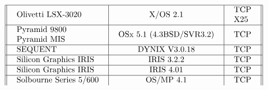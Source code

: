 \[\begin{tabular}[h]{||l|c|c||}
\hline
\begin{tabular}{l} Olivetti LSX-3020 \end{tabular} & \begin{tabular}{l}  X/OS 2.1 \end{tabular} & \begin{tabular}{l} TCP\\X25 \end{tabular} \\
\hline
\begin{tabular}{l} Pyramid 9800\\ Pyramid MIS \end{tabular} & \begin{tabular}{l}  OSx 5.1 (4.3BSD/SVR3.2) \end{tabular} & \begin{tabular}{l} TCP \end{tabular} \\
\hline
\begin{tabular}{l} SEQUENT \end{tabular} & \begin{tabular}{l}   DYNIX V3.0.18 \end{tabular} & \begin{tabular}{l} TCP \end{tabular} \\
\hline
\begin{tabular}{l} Silicon Graphics IRIS \end{tabular} & \begin{tabular}{l}  IRIS 3.2.2 \end{tabular} & \begin{tabular}{l} TCP \end{tabular} \\
\hline
\begin{tabular}{l} Silicon Graphics IRIS \end{tabular} & \begin{tabular}{l}  IRIS 4.01 \end{tabular} & \begin{tabular}{l} TCP \end{tabular} \\
\hline
\begin{tabular}{l} Solbourne Series 5/600 \end{tabular} & \begin{tabular}{l}  OS/MP 4.1 \end{tabular} & \begin{tabular}{l} TCP \end{tabular} \\

\end{tabular}\]
